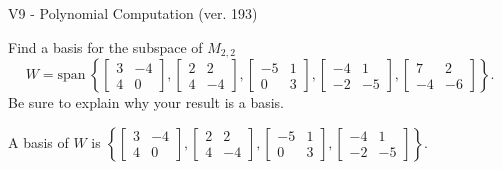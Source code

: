 \begin{exercise}
  \begin{exerciseTitle}V9 - Polynomial Computation (ver. 193)\end{exerciseTitle}
  \begin{exerciseStatement}
    Find a basis for the subspace of \(M_{2,2}\) 
\[W=\mathrm{span}\ \left\{\left[\begin{array}{cc}
3 & -4 \\
4 & 0
\end{array}\right] , \left[\begin{array}{cc}
2 & 2 \\
4 & -4
\end{array}\right] , \left[\begin{array}{cc}
-5 & 1 \\
0 & 3
\end{array}\right] , \left[\begin{array}{cc}
-4 & 1 \\
-2 & -5
\end{array}\right] , \left[\begin{array}{cc}
7 & 2 \\
-4 & -6
\end{array}\right]\right\}.\]
 Be sure to explain why your result is a basis.


  \end{exerciseStatement}
  \begin{exerciseAnswer}
   A basis of \(W\) is  \(\left\{\left[\begin{array}{cc}
3 & -4 \\
4 & 0
\end{array}\right] , \left[\begin{array}{cc}
2 & 2 \\
4 & -4
\end{array}\right] , \left[\begin{array}{cc}
-5 & 1 \\
0 & 3
\end{array}\right] , \left[\begin{array}{cc}
-4 & 1 \\
-2 & -5
\end{array}\right]\right\}\).
  


  \end{exerciseAnswer}
\end{exercise}